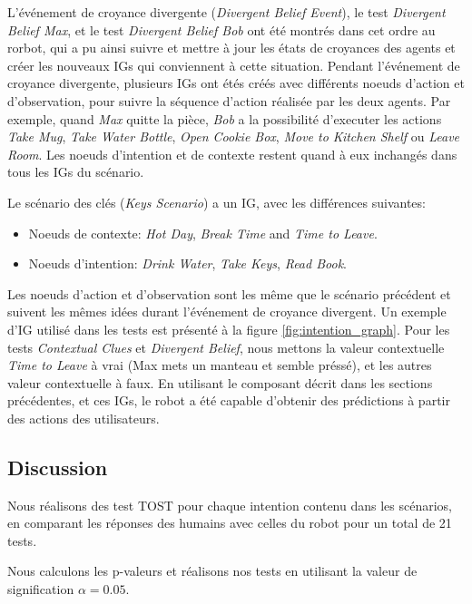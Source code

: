 \documentclass[a4paper,11pt,twoside]{StyleThese}
\begin{document}
L'événement de croyance divergente (\textit{Divergent Belief Event}), le test \textit{Divergent Belief Max}, et le test \textit{Divergent Belief Bob} ont été montrés dans cet ordre au rorbot, qui a pu ainsi suivre et mettre à jour les états de croyances des agents et créer les nouveaux IGs qui conviennent à cette situation. Pendant l'événement de croyance divergente, plusieurs IGs ont étés créés avec différents noeuds d'action et d'observation, pour suivre la séquence d'action réalisée par les deux agents. Par exemple, quand  \textit{Max} quitte la pièce, \textit{Bob} a la possibilité d'executer les actions \textit{Take Mug}, \textit{Take Water Bottle}, \textit{Open Cookie Box}, \textit{Move to Kitchen Shelf} ou \textit{Leave Room}. Les noeuds d'intention et de contexte restent quand à eux inchangés dans tous les IGs du scénario.


Le scénario des clés (\textit{Keys Scenario}) a un IG, avec les différences suivantes:
\begin{itemize}
\item Noeuds de contexte: \textit{Hot Day}, \textit{Break Time} and \textit{Time to Leave}.
\item Noeuds d'intention: \textit{Drink Water}, \textit{Take Keys}, \textit{Read Book}.
\end{itemize}

Les noeuds d'action et d'observation sont les même que le scénario précédent et suivent les mêmes idées durant l'événement de croyance divergent. Un exemple d'IG utilisé dans les tests est présenté à la figure \ref{fig:intention_graph}. Pour les tests \textit{Contextual Clues} et \textit{Divergent Belief}, nous mettons la valeur contextuelle \textit{Time to Leave} à vrai (Max mets un manteau et semble préssé), et les autres valeur contextuelle à faux. En utilisant le composant décrit dans les sections précédentes, et ces IGs, le robot a été capable d'obtenir des prédictions à partir des actions des utilisateurs.

\subsection{Discussion}
\label{discussion}
Nous réalisons des test TOST pour chaque intention contenu dans les scénarios, en comparant les réponses des humains avec celles du robot pour un total de 21 tests.

Nous calculons les p-valeurs et réalisons nos tests en utilisant la valeur de signification $\alpha=0.05$.
\end{document}
